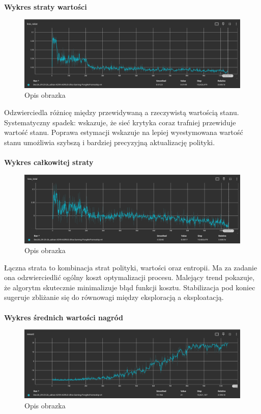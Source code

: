 \documentclass[a4paper, 12pt]{article}
\numberwithin{equation}{section}
\begin{document}
    \\ \\ 
    \textbf{Wykres straty wartości}
    \begin{figure}[H]
        \centering
        \includegraphics[width=\textwidth]{pictures/A2C_loss_value.png}
        \caption{Opis obrazka}
    \end{figure}
    Odzwierciedla różnicę między przewidywaną a rzeczywistą wartością stanu. Systematyczny spadek: wskazuje, że sieć krytyka coraz trafniej przewiduje wartość stanu.
    Poprawa estymacji wskazuje na lepiej wyestymowana wartość stanu umożliwia szybszą i bardziej precyzyjną aktualizację polityki.
    \\ \\ 
    \textbf{Wykres całkowitej straty}
    \begin{figure}[H]
        \centering
        \includegraphics[width=\textwidth]{pictures/A2C_loss_total.png}
        \caption{Opis obrazka}
    \end{figure}
    Łączna strata to kombinacja strat polityki, wartości oraz entropii. Ma za zadanie
    ona odzwierciedlić ogólny koszt optymalizacji procesu.
    Malejący trend pokazuje, że algorytm skutecznie minimalizuje błąd funkcji kosztu.
    Stabilizacja pod koniec sugeruje zbliżanie się do równowagi między eksploracją a eksploatacją.
    \\ \\ 
    \textbf{Wykres średnich wartości nagród}
    \begin{figure}[H]
        \centering
        \includegraphics[width=\textwidth]{pictures/A2C_reward.png}
        \caption{Opis obrazka}
    \end{figure}
\end{document}

